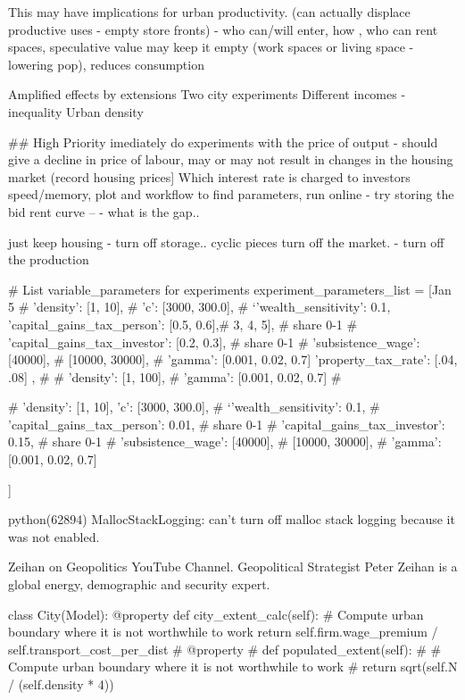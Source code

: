 This may have implications for urban productivity. (can actually displace productive uses - empty store fronts) - who can/will enter, how , who can rent spaces, speculative value may keep it empty (work spaces or living space - lowering pop), reduces consumption


Amplified effects by extensions
Two city experiments
Different incomes  - inequality
Urban density



## High Priority
imediately do experiments with the price of output - should give a decline in price of labour, may or may not result in changes in the housing market (record housing prices]
Which interest rate is charged to investors
speed/memory, plot and workflow to find parameters, run online - try storing the bid rent curve -- - what is the gap.. 

just keep housing - turn off storage..  cyclic pieces turn off the market. - turn off the production






# List variable_parameters for experiments
experiment_parameters_list = [Jan 5
 {
    #   'density': [1, 10],
        # 'c': [3000, 300.0], 
    #   `'wealth_sensitivity': 0.1,
      'capital_gains_tax_person':   [0.5, 0.6],# 3, 4, 5], # share 0-1
    #   'capital_gains_tax_investor': [0.2, 0.3], # share 0-1
    #   'subsistence_wage': [40000], # [10000, 30000],
    #   'gamma': [0.001, 0.02, 0.7]
        'property_tax_rate': [.04, .08]
    },
    # {
    #     'density': [1, 100],
    #     'gamma': [0.001, 0.02, 0.7]
    # }

    {
    #   'density': [1, 10],
        'c': [3000, 300.0], 
    #   `'wealth_sensitivity': 0.1,
    #   'capital_gains_tax_person':   0.01, # share 0-1
    #   'capital_gains_tax_investor': 0.15, # share 0-1
    #   'subsistence_wage': [40000], # [10000, 30000],
    #   'gamma': [0.001, 0.02, 0.7]
    
    }
]

python(62894) MallocStackLogging: can't turn off malloc stack logging because it was not enabled.

Zeihan on Geopolitics YouTube Channel. Geopolitical Strategist Peter Zeihan is a global energy, demographic and security expert.


class City(Model):
    @property
    def city_extent_calc(self):
        # Compute urban boundary where it is not worthwhile to work
        return self.firm.wage_premium /  self.transport_cost_per_dist
#    @property
#     def populated_extent(self):
#         # Compute urban boundary where it is not worthwhile to work
#         return sqrt(self.N /  (self.density * 4))


